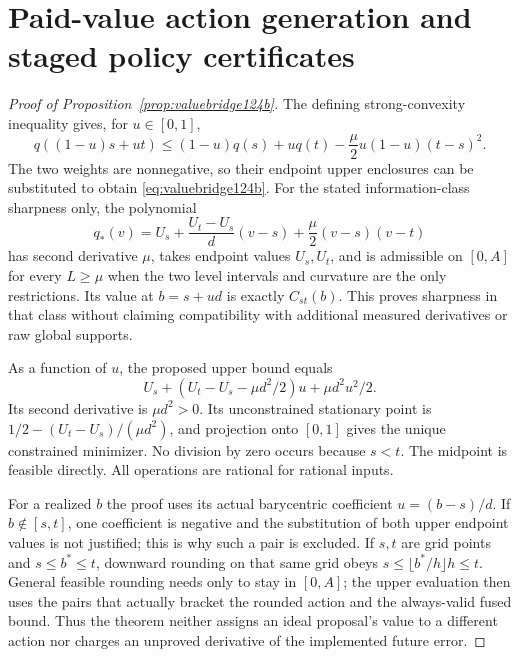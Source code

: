 \section{Paid-value action generation and staged policy certificates}
\label{supp:valuebridge124b}

\begin{proof}[Proof of Proposition~\ref{prop:valuebridge124b}]
The defining strong-convexity inequality gives, for $u\in[0,1]$,
\[
 q((1-u)s+ut)
 \le(1-u)q(s)+uq(t)-\frac\mu2u(1-u)(t-s)^2.
\]
The two weights are nonnegative, so their endpoint upper enclosures
can be substituted to obtain \eqref{eq:valuebridge124b}.
For the stated information-class sharpness only, the polynomial
\[
 q_*(v)=U_s+\frac{U_t-U_s}{d}(v-s)
                   +\frac\mu2(v-s)(v-t)
\]
has second derivative $\mu$, takes endpoint values $U_s,U_t$,
and is admissible on $[0,A]$ for every $L\ge\mu$ when the two
level intervals and curvature are the only restrictions. Its
value at $b=s+ud$ is exactly $C_{st}(b)$. This proves sharpness
in that class without claiming compatibility with additional
measured derivatives or raw global supports.

As a function of $u$, the proposed upper bound equals
\[
 U_s+(U_t-U_s-\mu d^2/2)u+\mu d^2u^2/2.
\]
Its second derivative is $\mu d^2>0$. Its unconstrained
stationary point is $1/2-(U_t-U_s)/(\mu d^2)$, and projection
onto $[0,1]$ gives the unique constrained minimizer. No division
by zero occurs because $s<t$. The midpoint is feasible directly.
All operations are rational for rational inputs.

For a realized $b$ the proof uses its actual barycentric coefficient
$u=(b-s)/d$. If $b\notin[s,t]$, one coefficient is negative and
the substitution of both upper endpoint values is not justified;
this is why such a pair is excluded. If $s,t$ are grid points
and $s\le b^*\le t$, downward rounding on that same grid obeys
$s\le\lfloor b^*/h\rfloor h\le t$. General feasible rounding
needs only to stay in $[0,A]$; the upper evaluation then uses
the pairs that actually bracket the rounded action and the
always-valid fused bound. Thus the theorem neither assigns an
ideal proposal's value to a different action nor charges an
unproved derivative of the implemented future error.
\end{proof}

